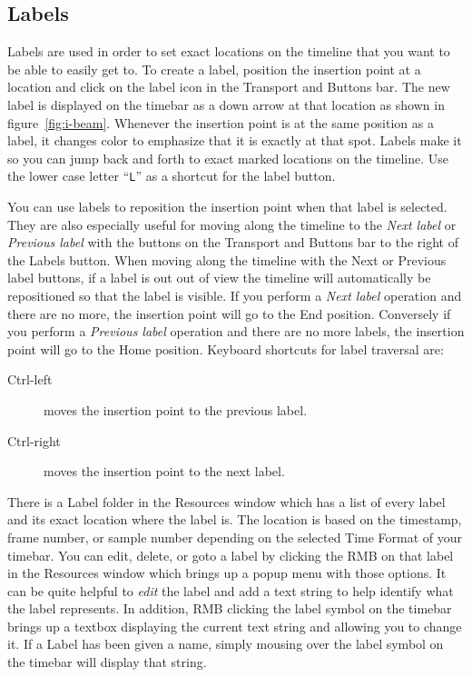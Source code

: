 \subsection{Labels}%
\label{sub:labels}

Labels are used in order to set exact locations on the timeline that you want to be able to easily get to. 
To create a label, position the insertion point  at a location and click on the label icon in the Transport
and Buttons bar. The new label is displayed on the timebar  as a down arrow at that location as shown in
figure~\ref{fig:i-beam}.  Whenever the insertion point is at the same position as a label, it changes
color to emphasize that it is exactly at that spot.
Labels make it so you can jump back and forth to exact marked locations on the timeline.
Use the lower case letter “\texttt{L}” as a shortcut for the label button.

You can use labels to reposition the insertion point when that label is selected. They are also
especially useful for moving along the timeline to the \textit{Next label} or \textit{Previous label}
with the buttons on the Transport and Buttons bar to the right of the Labels button.  
When moving along the timeline with the Next or Previous label buttons, if a label is out 
out of view the timeline will automatically be repositioned so that the label is visible.
If you perform a \textit{Next label} operation and there are no more, the insertion point
will go to the End position.  Conversely if you perform a \textit{Previous label} operation
and there are no more labels, the insertion point will go to the Home position. 
Keyboard shortcuts for label traversal are:

\begin{description}
    \item[Ctrl-left] moves the insertion point to the previous label.
    \item[Ctrl-right] moves the insertion point to the next label.
\end{description}

There is a  Label folder in the Resources window which has a list of every label and its exact location
where the label is. The location is based on the timestamp, frame number, or sample number depending on the selected Time Format of your timebar. 
You can edit, delete, or goto a label by clicking the RMB on that label in the Resources window which
brings up a popup menu with those options.  It can be quite helpful to \textit{edit} the label
and add a text string to help identify what the label represents.
In addition, RMB clicking the label symbol on the timebar brings up a textbox displaying the current
text string and allowing you to change it. If a Label has been given a name, simply mousing over
the label symbol on the timebar will display that string.

